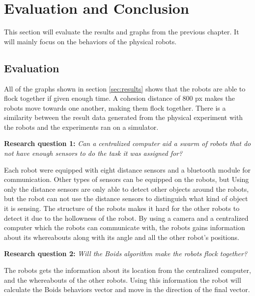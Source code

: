 \chapter{Evaluation and Conclusion}
\label{cha:evaluationAndConclusion}
This section will evaluate the results and graphs from the previous chapter. It will mainly focus on the behaviors of the physical robots.



\section{Evaluation}
\label{sec:Evaluation}
All of the graphs shown in section \ref{sec:results} shows that the robots are able to flock together if given enough time. A cohesion distance of 800 px makes the robots move towards one another, making them flock together. There is a similarity between the result data generated from the physical experiment with the robots and the experiments ran on a simulator.

\textbf{Research question 1:} {\it Can a centralized computer aid a swarm of robots that do not have enough sensors to do the task it was assigned for?}

Each robot were equipped with eight distance sensors and a bluetooth module for communication. Other types of sensors can be equipped on the robots, but 
Using only the distance sensors are only able to detect other objects around the robots, but the robot can not use the distance sensors to distinguish what kind of object it is sensing. The structure of the robots makes it hard for the other robots to detect it due to the hollowness of the robot. 
By using a camera and a centralized computer which the robots can communicate with, the robots gains information about its whereabouts along with its angle and all the other robot's positions. 

\textbf{Research question 2:} {\it Will the Boids algorithm make the robots flock together?}

The robots gets the information about its location from the centralized computer, and the whereabouts of the other robots. Using this information the robot will calculate the Boids behaviors vector and move in the direction of the final vector.

